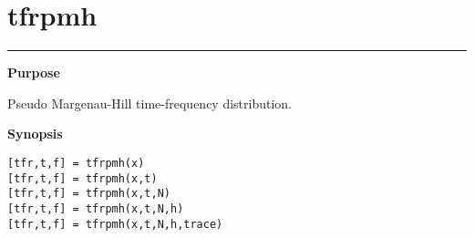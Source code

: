 

\section*{\hspace*{-1.6cm} tfrpmh}

\vspace*{-.4cm}
\hspace*{-1.6cm}\rule[0in]{16.5cm}{.02cm}
\vspace*{.2cm}

{\bf \large \sf Purpose}\\
\hspace*{1.5cm}
\begin{minipage}[t]{13.5cm}
Pseudo Margenau-Hill time-frequency distribution.
\end{minipage}
\vspace*{.5cm}

{\bf \large \sf Synopsis}\\
\hspace*{1.5cm}
\begin{minipage}[t]{13.5cm}
\begin{verbatim}
[tfr,t,f] = tfrpmh(x)
[tfr,t,f] = tfrpmh(x,t)
[tfr,t,f] = tfrpmh(x,t,N)
[tfr,t,f] = tfrpmh(x,t,N,h)
[tfr,t,f] = tfrpmh(x,t,N,h,trace)
\end{verbatim}
\end{minipage}
\vspace*{.5cm}

